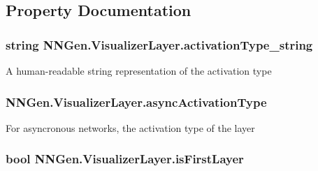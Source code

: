 \subsection{Property Documentation}
\hypertarget{class_n_n_gen_1_1_visualizer_layer_a2f19de515420357a18d890cec3a3e43b}{}
\subsubsection[{activation\+Type\+\_\+string}]{\setlength{\rightskip}{0pt plus 5cm}string N\+N\+Gen.\+Visualizer\+Layer.\+activation\+Type\+\_\+string\hspace{0.3cm}{\ttfamily [get]}}\label{class_n_n_gen_1_1_visualizer_layer_a2f19de515420357a18d890cec3a3e43b}


A human-\/readable string representation of the activation type 

\hypertarget{class_n_n_gen_1_1_visualizer_layer_ace064a62dbac8d9ba6ab091f3275f809}{}
\subsubsection[{async\+Activation\+Type}]{ N\+N\+Gen.\+Visualizer\+Layer.\+async\+Activation\+Type\hspace{0.3cm}{\ttfamily [get]}}\label{class_n_n_gen_1_1_visualizer_layer_ace064a62dbac8d9ba6ab091f3275f809}


For asyncronous networks, the activation type of the layer 

\hypertarget{class_n_n_gen_1_1_visualizer_layer_a260e665a2e4ec4651ff796c4de269eca}{}
\subsubsection[{is\+First\+Layer}]{\setlength{\rightskip}{0pt plus 5cm}bool N\+N\+Gen.\+Visualizer\+Layer.\+is\+First\+Layer\hspace{0.3cm}{\ttfamily [get]}}\label{class_n_n_gen_1_1_visualizer_layer_a260e665a2e4ec4651ff796c4de269eca}


